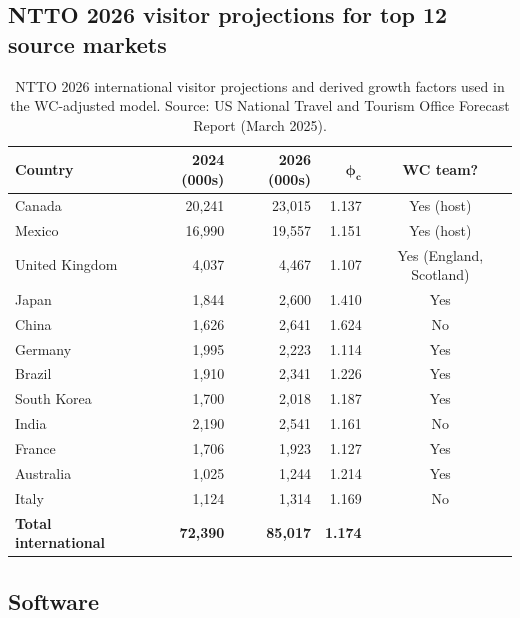 \documentclass[12pt]{article}
\begin{document}
\subsection*{NTTO 2026 visitor projections for top 12 source markets}

\begin{table}[h!]
\centering
\caption{NTTO 2026 international visitor projections and derived
  growth factors used in the WC-adjusted model. Source:
  US National Travel and Tourism Office Forecast Report
  (March 2025).}
\label{tab:ntto}
\small
\begin{tabular}{lrrrc}
\toprule
\textbf{Country} & \textbf{2024 (000s)} & \textbf{2026 (000s)}
  & $\boldsymbol{\phi_c}$ & \textbf{WC team?} \\
\midrule
Canada         & 20,241 & 23,015 & 1.137 & Yes (host) \\
Mexico         & 16,990 & 19,557 & 1.151 & Yes (host) \\
United Kingdom & 4,037  & 4,467  & 1.107 & Yes (England, Scotland) \\
Japan          & 1,844  & 2,600  & 1.410 & Yes \\
China          & 1,626  & 2,641  & 1.624 & No \\
Germany        & 1,995  & 2,223  & 1.114 & Yes \\
Brazil         & 1,910  & 2,341  & 1.226 & Yes \\
South Korea    & 1,700  & 2,018  & 1.187 & Yes \\
India          & 2,190  & 2,541  & 1.161 & No \\
France         & 1,706  & 1,923  & 1.127 & Yes \\
Australia      & 1,025  & 1,244  & 1.214 & Yes \\
Italy          & 1,124  & 1,314  & 1.169 & No \\
\midrule
\textbf{Total international} & \textbf{72,390} & \textbf{85,017}
  & \textbf{1.174} & \\
\bottomrule
\end{tabular}
\end{table}

\subsection*{Software}
\end{document}

